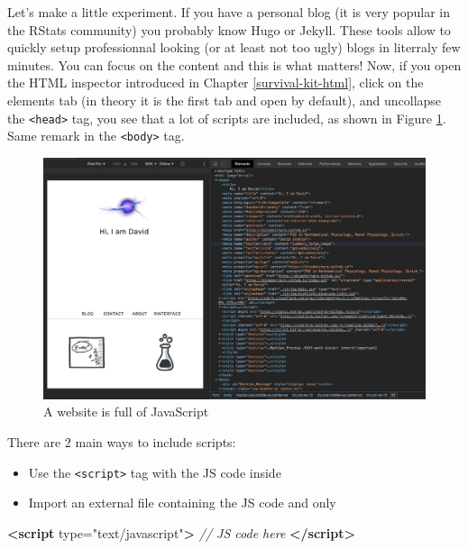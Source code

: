 \documentclass[]{book}
\newenvironment{Shaded}{\begin{snugshade}}{\end{snugshade}}
\newcommand{\CommentTok}[1]{\textcolor[rgb]{0.56,0.35,0.01}{\textit{#1}}}
\newcommand{\KeywordTok}[1]{\textcolor[rgb]{0.13,0.29,0.53}{\textbf{#1}}}
\newcommand{\OtherTok}[1]{\textcolor[rgb]{0.56,0.35,0.01}{#1}}
\newcommand{\StringTok}[1]{\textcolor[rgb]{0.31,0.60,0.02}{#1}}
\providecommand{\tightlist}{%
  \setlength{\itemsep}{0pt}\setlength{\parskip}{0pt}}
\begin{document}
Let's make a little experiment. If you have a personal blog (it is very popular in the RStats community) you probably know Hugo or Jekyll. These tools allow to quickly setup professionnal looking (or at least not too ugly) blogs in literraly few minutes. You can focus on the content and this is what matters! Now, if you open the HTML inspector introduced in Chapter \ref{survival-kit-html}, click on the elements tab (in theory it is the first tab and open by default), and uncollapse the \texttt{\textless{}head\textgreater{}} tag, you see that a lot of scripts are included, as shown in Figure \ref{fig:scripts-list}. Same remark in the \texttt{\textless{}body\textgreater{}} tag.

\begin{figure}
\includegraphics[width=34.86in]{images/survival-kit/scripts-list} \caption{A website is full of JavaScript}\label{fig:scripts-list}
\end{figure}

There are 2 main ways to include scripts:

\begin{itemize}
\tightlist
\item
  Use the \texttt{\textless{}script\textgreater{}} tag with the JS code inside
\item
  Import an external file containing the JS code and only
\end{itemize}

\begin{Shaded}
\begin{Highlighting}[]
\KeywordTok{<script}\OtherTok{ type=}\StringTok{"text/javascript"}\KeywordTok{>}
\CommentTok{// JS code here}
\KeywordTok{</script>}
\end{Highlighting}
\end{Shaded}
\end{document}
